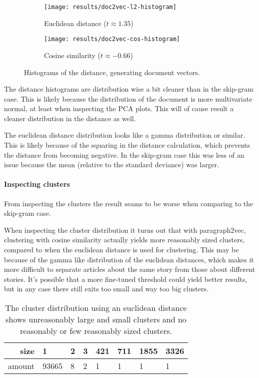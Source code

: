 \begin{figure}[H]
        \centering
        \begin{subfigure}[b]{0.49\textwidth}
                \texttt{[image: results/doc2vec-l2-histogram]}
                \caption{Euclidean distance ($t \approx 1.35$)}
        \end{subfigure}
        \begin{subfigure}[b]{0.49\textwidth}
                \texttt{[image: results/doc2vec-cos-histogram]}
                \caption{Cosine similarity ($t \approx -0.66$)}
        \end{subfigure}
        \caption{Histograms of the distance, generating document vectors.}
\end{figure}

The distance histograms are distribution wise a bit cleaner than in the skip-gram case. This is likely because the distribution of the document is more multivariate normal, at least when inspecting the PCA plots. This will of cause result a cleaner distribution in the distance as well.

The euclidean distance distribution looks like a gamma distribution or similar. This is likely because of the squaring in the distance calculation, which prevents the distance from becoming negative. In the skip-gram case this was less of an issue because the mean (relative to the standard deviance) was larger.

\paragraph{Inspecting clusters} From inspecting the clusters the result seams to be worse when comparing to the skip-gram case.

When inspecting the cluster distribution it turns out that with paragraph2vec, clustering with cosine similarity actually yields more reasonably sized clusters, compared to when the euclidean distance is used for clustering. This may be because of the gamma like distribution of the euclidean distances, which makes it more difficult to separate articles about the same story from those about different stories. It's possible that a more fine-tuned threshold could yield better results, but in any case there still exits too small and way too big clusters.

\begin{table}[H]
\centering
\begin{tabular}{r|l l l l l l l }
size & 1 & 2 & 3 & 421 & 711 & 1855 & 3326 \\ \hline
amount & 93665 & 8 & 2 & 1 & 1 & 1 & 1
\end{tabular}
\caption{The cluster distribution using an euclidean distance shows unreasonably large and small clusters and no reasonably or few reasonably sized clusters.}
\end{table}

